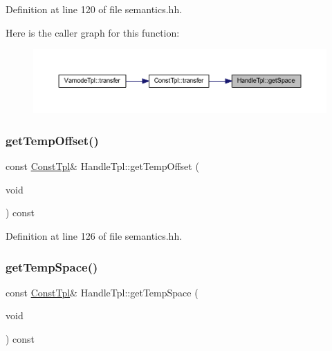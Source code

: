 Definition at line 120 of file semantics.\+hh.

Here is the caller graph for this function\+:
\nopagebreak
\begin{figure}[H]
\begin{center}
\leavevmode
\includegraphics[width=350pt]{class_handle_tpl_a5f4ad63ff134b7f4ccd5e0a850a4b54d_icgraph}
\end{center}
\end{figure}
\mbox{\label{class_handle_tpl_affc924ba1240b7dcd0df72398e34d85d}} 
\subsubsection{\texorpdfstring{getTempOffset()}{getTempOffset()}}
{\footnotesize\ttfamily const \mbox{\hyperlink{class_const_tpl}{Const\+Tpl}}\& Handle\+Tpl\+::get\+Temp\+Offset (\begin{DoxyParamCaption}\item[{void}]{ }\end{DoxyParamCaption}) const\hspace{0.3cm}{\ttfamily [inline]}}



Definition at line 126 of file semantics.\+hh.

\mbox{\label{class_handle_tpl_a948f2f911e4564fa3f6ef99c335d179d}} 
\subsubsection{\texorpdfstring{getTempSpace()}{getTempSpace()}}
{\footnotesize\ttfamily const \mbox{\hyperlink{class_const_tpl}{Const\+Tpl}}\& Handle\+Tpl\+::get\+Temp\+Space (\begin{DoxyParamCaption}\item[{void}]{ }\end{DoxyParamCaption}) const\hspace{0.3cm}{\ttfamily [inline]}}



